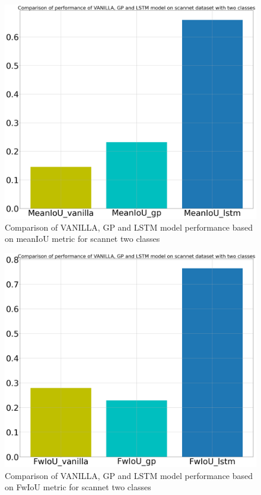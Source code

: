 	\begin{figure}
		\centering
		\includegraphics[width=12cm]{images/two_classes_meanIoU.png}
		\caption{Comparison of VANILLA, GP and LSTM model performance based on meanIoU metric for scannet two classes}
		\label{fig:unet_model_metric_comparison}
	\end{figure}

	\begin{figure}
		\centering
		\includegraphics[width=12cm]{images/two_classes_FwIoU.png}
		\caption{Comparison of VANILLA, GP and LSTM model performance based on FwIoU metric for scannet two classes}
		\label{fig:unet_model_metric_comparison}
	\end{figure}

